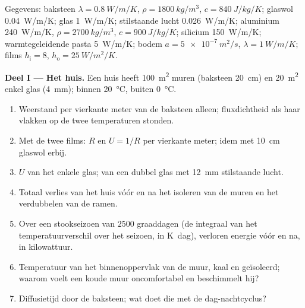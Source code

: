 \begin{problem}\label{pb:b2:heat-conduction:1}
Gegevens: baksteen $\lambda = \qty{0.8}{W/m/K}$,
$\rho = \qty{1800}{kg/m^3}$, $c =
\qty{840}{J/kg/K}$; glaswol
\qty{0.04}{W/m/K}; glas \qty{1}{W/m/K}; stilstaande
lucht \qty{0.026}{W/m/K}; aluminium \qty{240}{W/m/K}, $\rho = \qty{2700}{kg/m^3}$,
$c = \qty{900}{J/kg/K}$; silicium \qty{150}{W/m/K}; warmtegeleidende pasta
\qty{5}{W/m/K}; bodem $a = \qty{5e-7}{m^2/s}$, $\lambda = \qty{1}{W/m/K}$;
films $h_{\text{i}} = 8$, $h_{\text{o}} = \qty{25}{W/m^2/K}$.

\textbf{Deel I --- Het huis.}
Een huis heeft \qty{100}{m^2} muren (baksteen \qty{20}{cm}) en \qty{20}{m^2}
enkel glas (\qty{4}{mm}); binnen \qty{20}{\celsius},
buiten \qty{0}{\celsius}.
\begin{enumerate}
  \item Weerstand per vierkante meter van de baksteen alleen; fluxdichtheid
        als haar vlakken op de twee temperaturen stonden.
  \item Met de twee films: $R$ en $U = 1/R$ per vierkante meter; idem
        met \qty{10}{cm} glaswol erbij.
  \item $U$ van het enkele glas; van een dubbel glas met \qty{12}{mm}
        stilstaande lucht.
  \item Totaal verlies van het huis vóór en na het isoleren van de muren
        en het verdubbelen van de ramen.
  \item Over een stookseizoen van $2500$ graaddagen (de integraal van
        het temperatuurverschil over het seizoen, in \unit{K.dag}),
        verloren energie vóór en na, in kilowattuur.
  \item Temperatuur van het binnenoppervlak van de muur, kaal en geïsoleerd;
        waarom voelt een koude muur oncomfortabel en beschimmelt hij?
  \item Diffusietijd door de baksteen; wat doet die met de
        dag-nachtcyclus?
\end{enumerate}


\end{problem}
